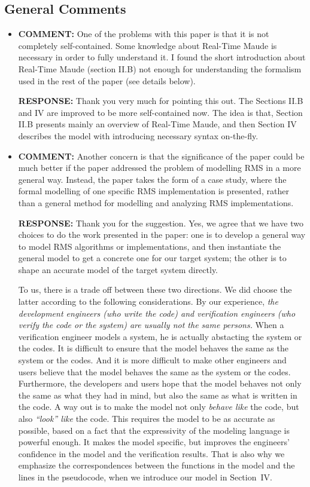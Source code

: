 \documentclass[10pt,journal]{IEEEtran}
\newcommand{\ANSWER}{{\bf RESPONSE: }}
\newcommand{\COMMENT}{{\bf COMMENT: }}
\begin{document}
\subsection{General Comments}
\begin{itemize}
\item
\COMMENT One of the problems with this paper is that it is not
completely self-contained.  Some knowledge about Real-Time Maude is
necessary in order to fully understand it.  I found the short
introduction about Real-Time Maude (section II.B) not enough for
understanding the formalism used in the rest of the paper (see details
below).

\ANSWER Thank you very much for pointing this out. The Sections II.B
and IV are improved to be more self-contained now. The idea is that,
Section II.B presents mainly an overview of Real-Time Maude, and then
Section IV describes the model with introducing necessary syntax
on-the-fly.

\item
\COMMENT Another concern is that the significance of the paper could
be much better if the paper addressed the problem of modelling RMS in
a more general way. Instead, the paper takes the form of a case study,
where the formal modelling of one specific RMS implementation is
presented, rather than a general method for modelling and analyzing
RMS implementations.

\ANSWER Thank you for the suggestion. Yes, we agree that we have two
choices to do the work presented in the paper: one is to develop a
general way to model RMS algorithms or implementations, and then
instantiate the general model to get a concrete one for our target
system; the other is to shape an accurate model of the target system
directly. 

To us, there is a trade off between these two directions. We did
choose the latter according to the following considerations. By our
experience, \emph{the development engineers (who write the code) and
  verification engineers (who verify the code or the system) are
  usually not the same persons.} When a verification engineer models a
system, he is actually abstacting the system or the codes. It is
difficult to ensure that the model behaves the same as the system or
the codes.  And it is more difficult to make other engineers and users
believe that the model behaves the same as the system or the
codes. Furthermore, the developers and users hope that the model
behaves not only the same as what they had in mind, but also the same
as what is written in the code. A way out is to make the model not
only \emph{behave like} the code, but also \emph{``look'' like} the
code. This requires the model to be as accurate as possible, based on
a fact that the expressivity of the modeling language is powerful
enough. It makes the model specific, but improves the engineers'
confidence in the model and the verification results. That is also why
we emphasize the correspondences between the functions in the model
and the lines in the pseudocode, when we introduce our model in
Section~IV. 


\end{itemize}
\end{document}
